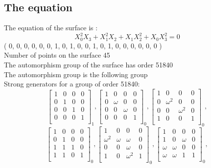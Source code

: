 \subsection*{The equation}
The equation of the surface  is :
$$
X_{0}^2X_{3} + X_{1}^2X_{2} + X_{1}X_{2}^2 + X_{0}X_{3}^2
=0
$$
( 0, 0, 0, 0, 0, 0, 1, 0, 1, 0, 0, 1, 0, 1, 0, 0, 0, 0, 0, 0 )\\
Number of points on the surface 45\\
The automorphism group of the surface has order 51840\\
The automorphism group is the following group\\
Strong generators for a group of order 51840:
$$
\left[
\begin{array}{*{4}{r}}
1 & 0 & 0 & 0\\
0 & 1 & 0 & 0\\
0 & 0 & 1 & 0\\
0 & 0 & 0 & 1\\
\end{array}
\right]
_{1}
, 
\left[
\begin{array}{*{4}{r}}
1 & 0 & 0 & 0\\
0 & \omega  & 0 & 0\\
0 & 0 & \omega  & 0\\
0 & 0 & 0 & 1\\
\end{array}
\right]
_{0}
, 
\left[
\begin{array}{*{4}{r}}
1 & 0 & 0 & 0\\
0 & \omega^{2} & 0 & 0\\
0 & 0 & \omega^{2} & 0\\
1 & 0 & 0 & 1\\
\end{array}
\right]
_{0}
, 
$$
$$
\left[
\begin{array}{*{4}{r}}
1 & 0 & 0 & 0\\
0 & 1 & 0 & 0\\
1 & 1 & 1 & 0\\
1 & 1 & 0 & 1\\
\end{array}
\right]
_{0}
, 
\left[
\begin{array}{*{4}{r}}
1 & 0 & 0 & 0\\
\omega^{2} & \omega  & \omega  & 0\\
0 & 0 & \omega  & 0\\
1 & 0 & \omega^{2} & 1\\
\end{array}
\right]
_{0}
, 
\left[
\begin{array}{*{4}{r}}
1 & 0 & 0 & 0\\
1 & 0 & \omega  & 0\\
\omega  & \omega  & 0 & 0\\
\omega  & \omega  & 1 & 1\\
\end{array}
\right]
_{0}
, 
$$
